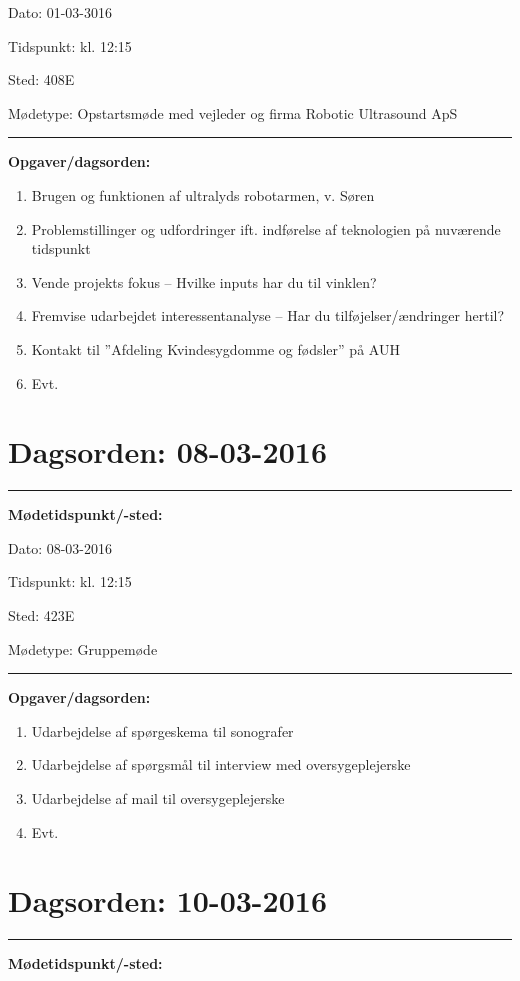Dato: \tabto{7em} 01-03-3016

Tidspunkt: \tabto{7em} kl. 12:15

Sted: \tabto{7em} 408E

Mødetype: \tabto{7em} Opstartsmøde med vejleder og firma Robotic Ultrasound ApS \newline


\hrule
\textbf{Opgaver/dagsorden:} \newline
\begin{enumerate}
	\item Brugen og funktionen af ultralyds robotarmen, v. Søren
	\item Problemstillinger og udfordringer ift. indførelse af teknologien på nuværende tidspunkt
	\item Vende projekts fokus – Hvilke inputs har du til vinklen?
	\item Fremvise udarbejdet interessentanalyse – Har du tilføjelser/ændringer hertil?
	\item Kontakt til ”Afdeling Kvindesygdomme og fødsler” på AUH 
	\item Evt. 
\end{enumerate}


\section{Dagsorden: 08-03-2016 }
\hrule
\textbf{Mødetidspunkt/-sted:} 

Dato: \tabto{7em} 08-03-2016

Tidspunkt: \tabto{7em} kl. 12:15

Sted: \tabto{7em} 423E

Mødetype: \tabto{7em} Gruppemøde \newline


\hrule
\textbf{Opgaver/dagsorden:} \newline
\begin{enumerate}
	\item Udarbejdelse af spørgeskema til sonografer
	\item Udarbejdelse af spørgsmål til  interview med oversygeplejerske
	\item Udarbejdelse af mail  til oversygeplejerske 
	\item Evt. 
\end{enumerate}


\section{Dagsorden: 10-03-2016 }
\hrule
\textbf{Mødetidspunkt/-sted:} 

